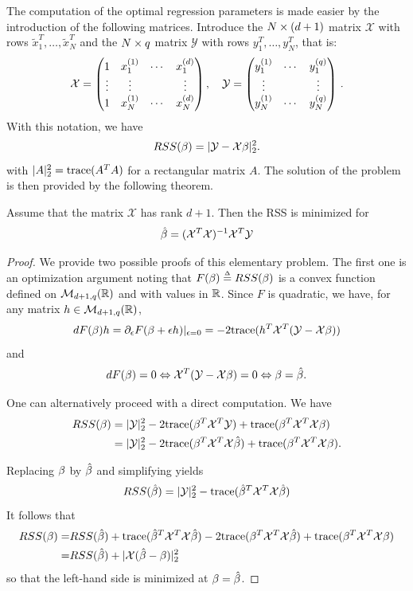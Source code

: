 The computation of the optimal regression parameters is made easier by the introduction of the following matrices.
 Introduce the $N\times (d+1)$ matrix $\mathcal X$ with rows $\tilde x_1^T, \ldots, \tilde x_N^T$ and the $N\times q$ matrix 
$\mathcal Y$ with rows $y_1^{T}, \ldots, y_N^{T}$, 
that is:
\[
 {\mathcal X} = \begin{pmatrix} 1 & x_1^{(1)} & \cdots & x_1^{(d)} \\ \vdots & \vdots && \vdots \\  1 & x_N^{(1)} & \cdots & x_N^{(d)} \end{pmatrix}, \quad
 {\mathcal Y} = \begin{pmatrix} y_1^{(1)} & \cdots & y_1^{(q)} \\ \vdots && \vdots \\  y_N^{(1)} & \cdots & y_N^{(q)}\end{pmatrix}\,.
\]
With this notation, we have
\[
RSS(\beta) = |\mathcal Y - \mathcal X \beta|_{2}^2.
\]
with $|A|_{2}^{2} = {\mathrm{trace}}(A^{T}A)$ for a rectangular matrix $A$. The solution of the problem is then provided by the following theorem.
\begin{theorem}
\label{th:ls.reg}
Assume that the matrix $\mathcal X$ has rank $d+1$. Then the RSS is
minimized for 
\[
\hat \beta = ({\mathcal X}^T{\mathcal X})^{-1} {\mathcal X}^T \mathcal Y
\]
\end{theorem}
\begin{proof}
We provide two possible proofs of this elementary problem. The first one is an optimization argument noting that
$F(\beta) \stackrel{{\scriptscriptstyle \Delta}}{=} RSS(\beta)$ is a convex function defined on ${\mathcal M}_{d+1,q}({\mathbb{R}})$ and with values in ${\mathbb{R}}$. Since $F$ is quadratic, we have, for any matrix $h\in {\mathcal M}_{d+1,q}({\mathbb{R}})$, 
\[
dF(\beta) h = \partial_\epsilon F(\beta+\epsilon h){|_{\epsilon=0}} = - 2 {\mathrm{trace}}( h^{T} {\mathcal X}^{T} ({\mathcal Y}-{\mathcal X}\beta))
\]
and
\[
dF(\beta) = 0 \Leftrightarrow {\mathcal X}^{T} ({\mathcal Y}-{\mathcal X}\beta) = 0 \Leftrightarrow\beta = \hat{\beta}.
\]

One can alternatively proceed with a direct computation.
We have
\begin{align*}
RSS(\beta) &= |{\mathcal Y}|^{2}_{2} - 2{\mathrm{trace}}(\beta^{T} {\mathcal X}^{T}{\mathcal Y}) + {\mathrm{trace}}(\beta^{T}{\mathcal X}^{T}{\mathcal X}\beta) \\
& = |{\mathcal Y}|^{2}_{2} - 2{\mathrm{trace}}(\beta^{T} {\mathcal X}^T{\mathcal X} \hat {\beta} ) + {\mathrm{trace}}(\beta^{T}{\mathcal X}^{T}{\mathcal X}\beta).
\end{align*}
\item Replacing $\beta$ by $\hat{\beta}$ and simplifying yields
\[
RSS(\hat {\beta}) = |{\mathcal Y}|^{2}_{2} - {\mathrm{trace}}(\hat {\beta}^{T} {\mathcal X}^T{\mathcal X} \hat{\beta} )
\]
It follows that 
\begin{align*}
RSS(\beta) =& RSS(\hat{\beta}) + {\mathrm{trace}}(\hat {\beta}^{T} {\mathcal X}^T{\mathcal X}\hat{\beta} )-  2{\mathrm{trace}}(\beta^{T} {\mathcal X}^T{\mathcal X} \hat{\beta} ) 
+ {\mathrm{trace}}(\beta^{T}{\mathcal X}^{T}{\mathcal X}\beta)\\
=& RSS(\hat{\beta}) + |\mathcal X(\hat{\beta} - \beta)|^2_{2}
\end{align*}
so that the left-hand side is minimized at $\beta = \hat{\beta}$.
\end{proof}

